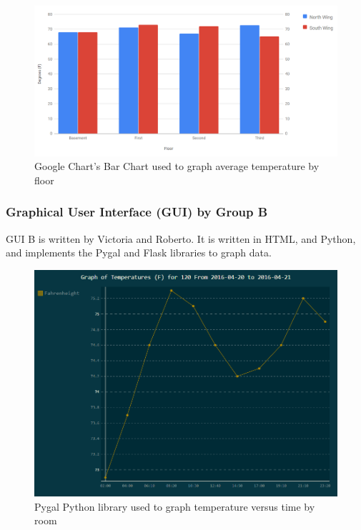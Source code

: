 \documentclass{article}
\begin{document}
				\begin{figure}[H]
					\begin{center}						
						\includegraphics[scale=.5]{averageFloorTemp.PNG}				
					\end{center}
					\captionsetup{labelformat=empty}
					\caption{Google Chart's Bar Chart used to graph average temperature by floor}
				\end{figure}			
			
			\subsubsection{Graphical User Interface (GUI) by Group B}
				GUI B is written by Victoria and Roberto. It is written in HTML, and Python, and implements the Pygal and Flask libraries to graph
				data.
				
				\begin{figure}[H]
					\begin{center}
						\includegraphics[scale=.48]{../graphs/GUI_B_by_room.PNG}
					\end{center}
					\captionsetup{labelformat=empty}
					\caption{Pygal Python library used to graph temperature versus time by room}
				\end{figure}			
				
\end{document}
